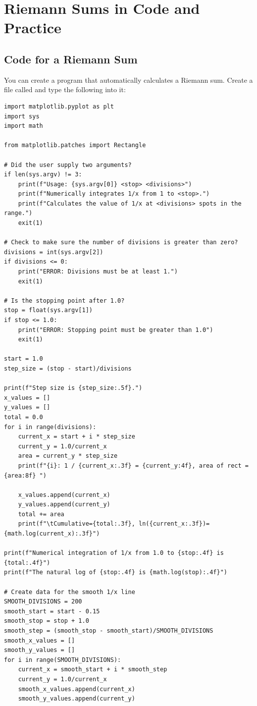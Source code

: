 \chapter{Riemann Sums in Code and Practice}

\section{Code for a Riemann Sum}
You can create a program that automatically calculates a Riemann sum. Create a file called  and type the following into it:

\begin{verbatim}
import matplotlib.pyplot as plt
import sys
import math

from matplotlib.patches import Rectangle

# Did the user supply two arguments?
if len(sys.argv) != 3:
    print(f"Usage: {sys.argv[0]} <stop> <divisions>")
    print(f"Numerically integrates 1/x from 1 to <stop>.")
    print(f"Calculates the value of 1/x at <divisions> spots in the range.")
    exit(1)

# Check to make sure the number of divisions is greater than zero?
divisions = int(sys.argv[2])
if divisions <= 0:
    print("ERROR: Divisions must be at least 1.")
    exit(1)

# Is the stopping point after 1.0?
stop = float(sys.argv[1])
if stop <= 1.0:
    print("ERROR: Stopping point must be greater than 1.0")
    exit(1)

start = 1.0
step_size = (stop - start)/divisions

print(f"Step size is {step_size:.5f}.")
x_values = []
y_values = []
total = 0.0
for i in range(divisions):
    current_x = start + i * step_size
    current_y = 1.0/current_x
    area = current_y * step_size
    print(f"{i}: 1 / {current_x:.3f} = {current_y:4f}, area of rect = {area:8f} ")

    x_values.append(current_x)
    y_values.append(current_y)
    total += area
    print(f"\tCumulative={total:.3f}, ln({current_x:.3f})={math.log(current_x):.3f}")

print(f"Numerical integration of 1/x from 1.0 to {stop:.4f} is {total:.4f}")
print(f"The natural log of {stop:.4f} is {math.log(stop):.4f}")

# Create data for the smooth 1/x line
SMOOTH_DIVISIONS = 200
smooth_start = start - 0.15
smooth_stop = stop + 1.0
smooth_step = (smooth_stop - smooth_start)/SMOOTH_DIVISIONS
smooth_x_values = []
smooth_y_values = []
for i in range(SMOOTH_DIVISIONS):
    current_x = smooth_start + i * smooth_step
    current_y = 1.0/current_x
    smooth_x_values.append(current_x)
    smooth_y_values.append(current_y)


\end{verbatim}
